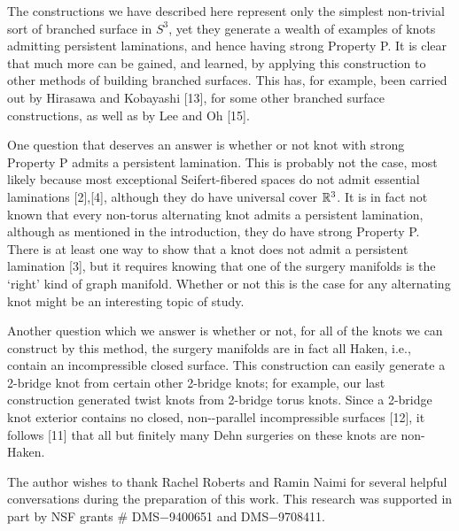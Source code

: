 The constructions we have described here represent only the simplest
non-trivial sort of branched surface in $S^3$, yet they generate a wealth 
of examples of knots admitting persistent laminations, and hence 
having strong Property P. It is clear that much more can be gained, 
and learned, by applying this construction to other methods of 
building branched surfaces. This has, for example, been carried out 
by Hirasawa and Kobayashi [13], for some other branched surface constructions,
as well as by Lee and Oh [15].

One question that deserves an answer is whether or not  
knot with strong Property P admits a persistent lamination. This is 
probably not the case, most likely because 
most exceptional Seifert-fibered spaces do not admit 
essential laminations [2],[4], although they do have universal cover ${\Bbb 
R}^3$. It is in fact not known that every non-torus alternating knot 
admits a persistent lamination, although as mentioned in the 
introduction, they do have strong Property P. There is at least one 
way to show that a knot does not admit a persistent lamination [3], 
but it requires knowing that one of the surgery manifolds is the 
`right' kind of graph manifold. Whether or not this is the case for 
any alternating knot might be an interesting topic of study.

Another question which we  answer is whether or not, for all 
of the knots we can construct by this method, the surgery manifolds 
are in fact all Haken, i.e., contain an incompressible closed 
surface. This construction can easily generate a 2-bridge 
knot from certain other 2-bridge knots; for example, our last construction 
generated twist knots from 2-bridge torus knots. Since a 
2-bridge knot exterior contains no closed, non-\del-parallel 
incompressible surfaces [12], it follows [11] that all but finitely 
many Dehn surgeries on these knots are non-Haken. 

\smallskip

\vglue 5pt

The author wishes to thank Rachel Roberts and Ramin Naimi for several helpful 
conversations during the preparation of this work. This research was supported 
in part by NSF grants \# DMS$-$9400651 and DMS$-$9708411.

\vfill\eject

\vglue 12pt
\vglue 5pt


\medskip
\ninerm\baselineskip=11pt
\frenchspacing

